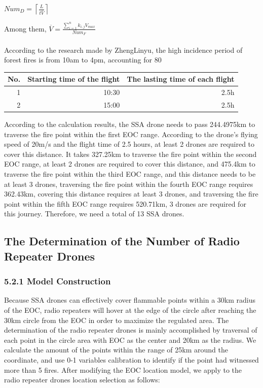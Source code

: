 \documentclass{mcmthesis}
\newcommand{\upcite}[1]{\textsuperscript{\textsuperscript{\cite{#1}}}}
\begin{document}
$Num_D=\left \lceil \frac{L}{t\overline V}  \right \rceil $

Among them,
$\overline{V}=\frac{ \sum_{i=1}^{n}  k_{i,j}V_{max} }{Num_{F}}  $


According to the research made by ZhengLinyu\upcite{4_best}, the high incidence period of forest fires is from 10am to 4pm, accounting for 80%

\begin{center}
  \begin{tabular}{|r|r|r|}
    \hline
    No.&Starting time of the flight &The lasting time of each flight \\ \hline
    1&10:30&  2.5h \\ \hline
    2&15:00 & 2.5h \\ \hline
    \end{tabular}
\end{center}

According to the calculation results, the SSA drone needs to pass 244.4975km to traverse the fire point within the first EOC range. According to the drone's flying speed of 20m/s and the flight time of 2.5 hours, at least 2 drones are required to cover this distance. It takes 327.25km to traverse the fire point within the second EOC range, at least 2 drones are required to cover this distance, and 475.4km to traverse the fire point within the third EOC range, and this distance needs to be at least 3 drones, traversing the fire point within the fourth EOC range requires 362.43km, covering this distance requires at least 3 drones, and traversing the fire point within the fifth EOC range requires 520.71km,  3 drones are required for this journey. Therefore, we need a total of 13 SSA drones.


\subsection{The Determination of the Number of Radio Repeater Drones}


\subsubsection*{5.2.1 Model Construction}

Because SSA drones can effectively cover flammable points within a 30km radius of the EOC, radio repeaters will hover at the edge of the circle after reaching the 30km circle from the EOC in order to maximize the regulated area. The determination of the radio repeater drones is mainly accomplished by traversal of each point in the circle area with EOC as the center and 20km as the radius. We calculate the amount of the points within the range of 25km around the coordinate, and use 0-1 variables calibration to identify if the point had witnessed more than 5 fires. After modifying the EOC location model, we apply to the radio repeater drones location selection as follows:
\end{document}
